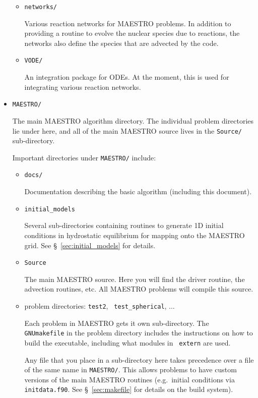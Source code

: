 \begin{itemize}
\begin{itemize}
 \item {\tt networks/}

 Various reaction networks for MAESTRO problems.  In addition to
 providing a routine to evolve the nuclear species due to reactions,
 the networks also define the species that are advected by the code.

 \item {\tt VODE/}

 An integration package for ODEs.  At the moment, this is used 
 for integrating various reaction networks.
 
 \end{itemize}

\item {\tt MAESTRO/}

 The main MAESTRO algorithm directory.  The individual problem directories
 lie under here, and all of the main MAESTRO source lives in the {\tt Source/}
 sub-directory.

 Important directories under {\tt MAESTRO/} include:

 \begin{itemize}

 \item {\tt docs/}

   Documentation describing the basic algorithm (including this
   document).

 \item {\tt initial\_models}

   Several sub-directories containing routines to generate
   1D initial conditions in hydrostatic equilibrium for 
   mapping onto the MAESTRO grid.  See \S~\ref{sec:initial_models}
   for details.

 \item {\tt Source}

   The main MAESTRO source.  Here you will find the driver routine, the
   advection routines, etc.  All MAESTRO problems will compile this
   source.

 \item problem directories: {\tt test2}, {\tt
   test\_spherical}, $\ldots$

   Each problem in MAESTRO gets it own sub-directory.  The {\tt
     GNUmakefile} in the problem directory includes the instructions
   on how to build the executable, including what modules in {\tt
     extern} are used.

   Any file that you place in a sub-directory here takes 
   precedence over a file of the same name in {\tt MAESTRO/}.
   This allows problems to have custom versions of the main
   MAESTRO routines (e.g.\ initial conditions via {\tt initdata.f90}.
   See \S~\ref{sec:makefile} for details on the build system).


\end{itemize}
\end{itemize}
